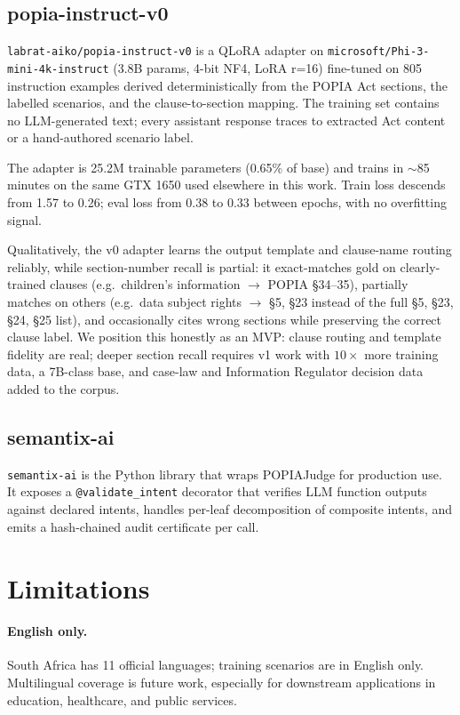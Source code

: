 \documentclass[11pt]{article}
\begin{document}
\subsection{popia-instruct-v0}
\texttt{labrat-aiko/popia-instruct-v0} is a QLoRA adapter on \texttt{microsoft/Phi-3-mini-4k-instruct} (3.8B params, 4-bit NF4, LoRA r=16) fine-tuned on 805 instruction examples derived deterministically from the POPIA Act sections, the labelled scenarios, and the clause-to-section mapping. The training set contains no LLM-generated text; every assistant response traces to extracted Act content or a hand-authored scenario label.

The adapter is 25.2M trainable parameters (0.65\% of base) and trains in $\sim$85 minutes on the same GTX 1650 used elsewhere in this work. Train loss descends from 1.57 to 0.26; eval loss from 0.38 to 0.33 between epochs, with no overfitting signal.

Qualitatively, the v0 adapter learns the output template and clause-name routing reliably, while section-number recall is partial: it exact-matches gold on clearly-trained clauses (e.g.\ children's information $\rightarrow$ POPIA \S 34--35), partially matches on others (e.g.\ data subject rights $\rightarrow$ \S 5, \S 23 instead of the full \S 5, \S 23, \S 24, \S 25 list), and occasionally cites wrong sections while preserving the correct clause label. We position this honestly as an MVP: clause routing and template fidelity are real; deeper section recall requires v1 work with $10\times$ more training data, a 7B-class base, and case-law and Information Regulator decision data added to the corpus.

\subsection{semantix-ai}
\texttt{semantix-ai} \cite{semantix-ai} is the Python library that wraps POPIAJudge for production use. It exposes a \texttt{@validate\_intent} decorator that verifies LLM function outputs against declared intents, handles per-leaf decomposition of composite intents, and emits a hash-chained audit certificate per call.

\section{Limitations}
\label{sec:limitations}

\paragraph{English only.} South Africa has 11 official languages; training scenarios are in English only. Multilingual coverage is future work, especially for downstream applications in education, healthcare, and public services.
\end{document}
